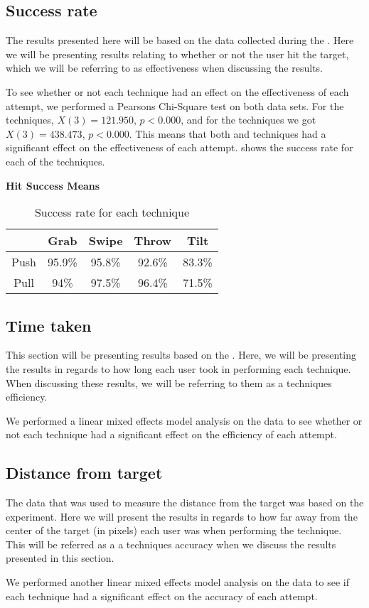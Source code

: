 \subsection{Success rate}
The results presented here will be based on the data collected during the \target. 
Here we will be presenting results relating to whether or not the user hit the target, which we will be referring to as effectiveness when discussing the results. 

To see whether or not each technique had an effect on the effectiveness of each attempt, we performed a Pearsons Chi-Square test on both data sets. 
For the \push techniques, $X(3)=121.950$, $p<0.000$, and for the \pull techniques we got $X(3)=438.473$, $p<0.000$. 
This means that both \push and \pull techniques had a significant effect on the effectiveness of each attempt. 
 shows the success rate for each of the techniques. 

\begin{table}[H]
	\centering
	\textbf{Hit Success Means}\\[4pt]
	\begin{adjustbox}{width=\columnwidth}
		\begin{tabular}{|c|c|c|c|c|}
			\hline
			\rowcolor[HTML]{9B9B9B} 
			& \textbf{Grab} & \textbf{Swipe} & \textbf{Throw} & \textbf{Tilt} \\ \hline
			Push & 95.9\% & 95.8\% & 92.6\% & 83.3\% \\ \hline
			Pull & 94\% & 97.5\% & 96.4\% & 71.5\% \\ \hline
		\end{tabular}
	\end{adjustbox}
	\caption{Success rate for each technique}
	\label{tab:successRate}
\end{table}

\subsection{Time taken}
This section will be presenting results based on the \target.
Here, we will be presenting the results in regards to how long each user took in performing each technique. 
When discussing these results, we will be referring to them as a techniques efficiency.

We performed a linear mixed effects model analysis on the data to see whether or not each technique had a significant effect on the efficiency of each attempt. 

\subsection{Distance from target}
The data that was used to measure the distance from the target was based on the \accuracy experiment.
Here we will present the results in regards to how far away from the center of the target (in pixels) each user was when performing the technique. 
This will be referred as a a techniques accuracy when we discuss the results presented in this section. 

We performed another linear mixed effects model analysis on the data to see if each technique had a significant effect on the accuracy of each attempt. 



